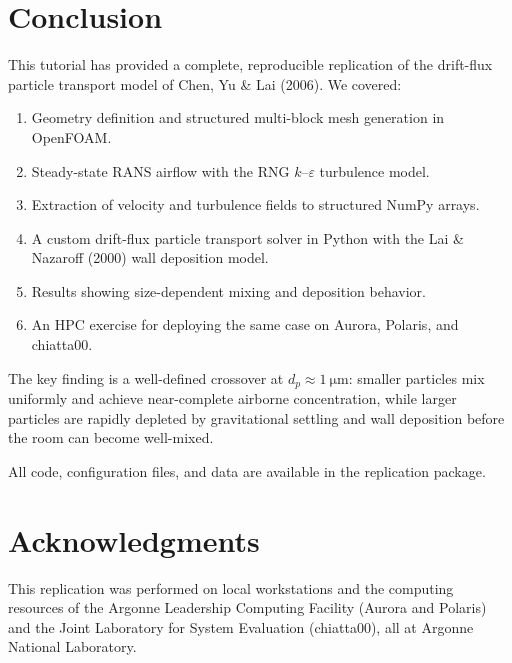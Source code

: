 \documentclass[12pt]{article}
\begin{document}
\section{Conclusion}

This tutorial has provided a complete, reproducible replication of the drift-flux particle transport model of Chen, Yu \& Lai (2006). We covered:

\begin{enumerate}
    \item Geometry definition and structured multi-block mesh generation in OpenFOAM.
    \item Steady-state RANS airflow with the RNG $k$--$\varepsilon$ turbulence model.
    \item Extraction of velocity and turbulence fields to structured NumPy arrays.
    \item A custom drift-flux particle transport solver in Python with the Lai \& Nazaroff (2000) wall deposition model.
    \item Results showing size-dependent mixing and deposition behavior.
    \item An HPC exercise for deploying the same case on Aurora, Polaris, and chiatta00.
\end{enumerate}

The key finding is a well-defined crossover at $d_p \approx \SI{1}{\micro\meter}$: smaller particles mix uniformly and achieve near-complete airborne concentration, while larger particles are rapidly depleted by gravitational settling and wall deposition before the room can become well-mixed.

All code, configuration files, and data are available in the replication package.

\section*{Acknowledgments}

This replication was performed on local workstations and the computing resources of the Argonne Leadership Computing Facility (Aurora and Polaris) and the Joint Laboratory for System Evaluation (chiatta00), all at Argonne National Laboratory.
\end{document}
